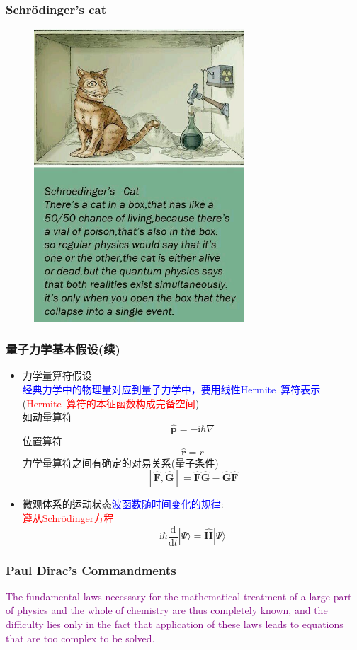 \documentclass[cjk,slidestop,compress,mathserif,blue]{beamer}
\begin{document}
\frame
{
	\frametitle{Schr\"odinger's cat}
\begin{figure}[h!]
\centering
\vspace{-10.5pt}
\includegraphics[height=0.70\textwidth,width=0.7\textwidth,viewport=0 0 760 750,clip]{Figures/Schrodinger-cat.jpg}
\label{Schrodinger-cat}
\end{figure}
}

\frame
{
	\frametitle{量子力学基本假设(续)}
	\begin{itemize}
		\item 力学量算符假设\\
			\textcolor{blue}{经典力学中的物理量对应到量子力学中，要用线性\textrm{Hermite~}算符表示}(\textcolor{red}{\textrm{Hermite~}算符的本征函数构成完备空间})\\
			如动量算符 
			$$\hat{\mathbf{p}}=-\mathrm{i}\hbar\nabla$$
			位置算符$$\hat{\mathbf r}=r$$
			力学量算符之间有确定的对易关系(量子条件)
			$$[\hat{\mathbf F},\hat{\mathbf G}]=\hat{\mathbf F}\hat{\mathbf G}-\hat{\mathbf G}\hat{\mathbf F}$$ 
			
		\item 微观体系的运动状态\textcolor{blue}{波函数随时间变化的规律}:\\\textcolor{red}{遵从\textrm{Schr\"odinger}方程}
			$$\mathrm{i}\hbar\dfrac{\mathrm{d}}{\mathrm{d}t}|\Psi\rangle=\hat{\mathbf H}|\Psi\rangle$$
	\end{itemize}
}

\frame
{
	\frametitle{\rm{Paul Dirac's Commandments}}
	\textrm{\textcolor{purple}{The fundamental laws necessary for the mathematical treatment of a large part of physics and the whole of chemistry are thus completely known, and the difficulty lies only in the fact that application of these laws leads to equations that are too complex to be solved.}}
}
\end{document}
